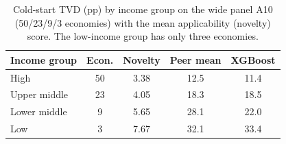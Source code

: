 \begin{table}
\caption{Cold-start TVD (pp) by income group on the wide panel A10 (50/23/9/3 economies) with the mean applicability (novelty) score. The low-income group has only three economies.}\label{tab:income}
\centering\footnotesize\setlength{\tabcolsep}{3pt}
\renewcommand{\arraystretch}{1.1}

\begin{tabular}{lcccc}
\toprule
Income group & Econ. & Novelty & Peer mean & XGBoost \\
\midrule
High & 50 & 3.38 & 12.5 & 11.4 \\
Upper middle & 23 & 4.05 & 18.3 & 18.5 \\
Lower middle & 9 & 5.65 & 28.1 & 22.0 \\
Low & 3 & 7.67 & 32.1 & 33.4 \\
\bottomrule
\end{tabular}
\end{table}
